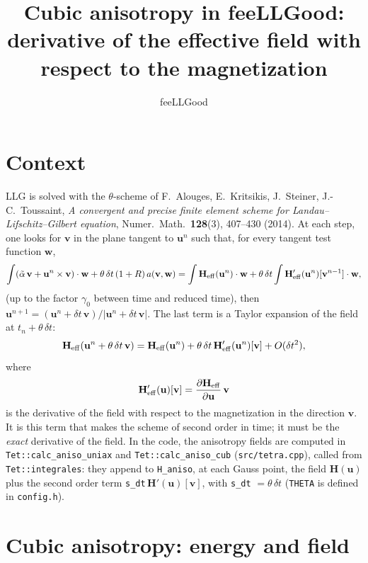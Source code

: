 \documentclass[11pt,a4paper]{article}
\title{Cubic anisotropy in feeLLGood:\\
derivative of the effective field with respect to the magnetization}
\author{feeLLGood}
\date{}
\newcommand{\bu}{\mathbf{u}}
\newcommand{\bv}{\mathbf{v}}
\newcommand{\bH}{\mathbf{H}}
\begin{document}
\maketitle

\section{Context}

LLG is solved with the $\theta$-scheme of
F.~Alouges, E.~Kritsikis, J.~Steiner, J.-C.~Toussaint,
\emph{A convergent and precise finite element scheme for Landau--Lifschitz--Gilbert
equation}, Numer.\ Math.\ \textbf{128}(3), 407--430 (2014).
At each step, one looks for $\bv$ in the plane tangent to $\bu^n$ such that, for every
tangent test function $\mathbf{w}$,
\begin{equation}
\int (\tilde\alpha\,\bv + \bu^n\times\bv)\cdot\mathbf{w}
 + \theta\,\delta t\,(1+R)\,a(\bv,\mathbf{w})
 = \int \bH_{\rm eff}(\bu^n)\cdot\mathbf{w}
 + \theta\,\delta t\int \bH'_{\rm eff}(\bu^n)[\bv^{n-1}]\cdot\mathbf{w},
\label{eq:scheme}
\end{equation}
(up to the factor $\gamma_0$ between time and reduced time),
then $\bu^{n+1}=(\bu^n+\delta t\,\bv)/|\bu^n+\delta t\,\bv|$.
The last term is a Taylor expansion of the field at $t_n+\theta\,\delta t$:
\[
\bH_{\rm eff}(\bu^n+\theta\,\delta t\,\bv)
 = \bH_{\rm eff}(\bu^n) + \theta\,\delta t\,\bH'_{\rm eff}(\bu^n)[\bv] + O(\delta t^2),
\]
where
\[
\bH'_{\rm eff}(\bu)[\bv] = \frac{\partial \bH_{\rm eff}}{\partial \bu}\,\bv
\]
is the derivative of the field with respect to the magnetization in the direction
$\bv$. It is this term that makes the scheme of second order in time; it must be the
\emph{exact} derivative of the field. In the code, the anisotropy fields are computed in
\texttt{Tet::calc\_aniso\_uniax} and \texttt{Tet::calc\_aniso\_cub}
(\texttt{src/tetra.cpp}), called from \texttt{Tet::integrales}: they append to
\texttt{H\_aniso}, at each Gauss point, the field $\bH(\bu)$ plus the second order term
\texttt{s\_dt}$\,\bH'(\bu)[\bv]$, with \texttt{s\_dt} $=\theta\,\delta t$ (\texttt{THETA}
is defined in \texttt{config.h}).

\section{Cubic anisotropy: energy and field}
\end{document}
